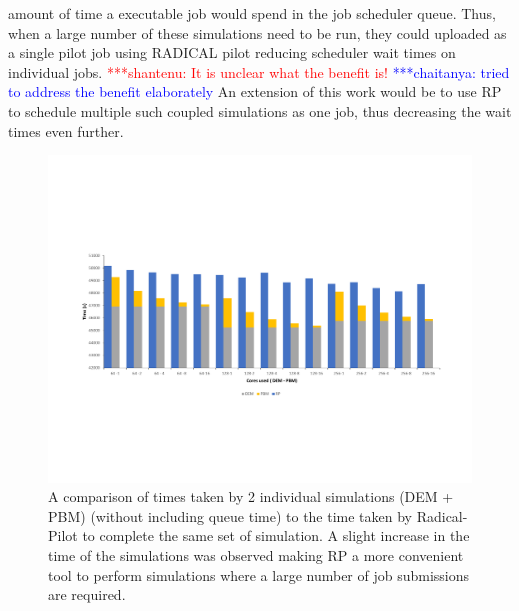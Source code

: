 \documentclass[preprint,11pt,authoryear]{elsarticle}
\newcommand{\jhanote}[1]{ {\textcolor{red} { ***shantenu: #1 }}}
\newcommand{\csnote}[1]{ {\textcolor{blue} { ***chaitanya: #1 }}}
\newcommand{\jhanote}[1]{}
\newcommand{\csnote}[1]{}
\begin{document}
amount of time a executable job would spend in the job scheduler queue.
Thus, when a large number of these simulations need to be run, they could uploaded 
as a single pilot job using RADICAL pilot reducing scheduler wait times on individual 
jobs. \jhanote{It is unclear what the
benefit is!}\csnote{tried to address the benefit elaborately} 
An extension of this work would be to use RP to schedule multiple such coupled simulations 
as one job, thus decreasing the wait times even further.
\begin{figure}
\centering
\includegraphics[scale=0.7]{rslts_RP_timeComparison.pdf}
\caption{A comparison of times taken by 2 individual simulations (DEM + PBM) (without 
including queue time) to the  time taken by Radical-Pilot to complete the same set of simulation. 
A slight increase in the time of the simulations was observed making RP a more convenient 
tool to perform simulations where a large number of job submissions are required.}
\label{fig:rslts_RP_time_plot}
\end{figure}
	    
\end{document}
